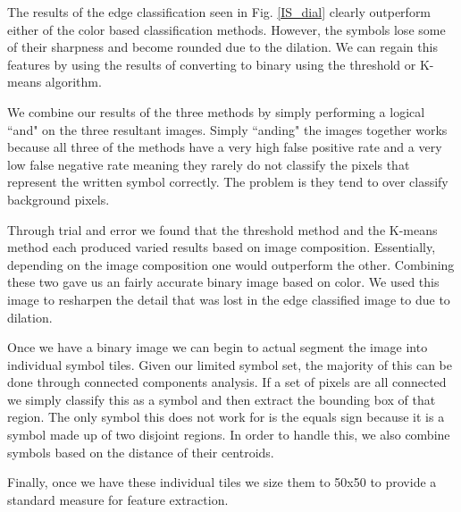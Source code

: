 
The results of the edge classification seen in Fig. \ref{IS_dial} clearly outperform either of the color based classification methods. However, the symbols lose some of their sharpness and become rounded due to the dilation. We can regain this features by using the results of converting to binary using the threshold or K-means algorithm.

We combine our results of the three methods by simply performing a logical ``and" on the three resultant images. Simply ``anding" the images together works because all three of the methods have a very high false positive rate and a very low false negative rate meaning they rarely do not classify the pixels that represent the written symbol correctly. The problem is they tend to over classify background pixels.


Through trial and error we found that the threshold method and the K-means method each produced varied results based on image composition. Essentially, depending on the image composition one would outperform the other. Combining these two gave us an fairly accurate binary image based on color. We used this image to resharpen the detail that was lost in the edge classified image to due to dilation.

Once we have a binary image we can begin to actual segment the image into individual symbol tiles. Given our limited symbol set, the majority of this can be done through connected components analysis. If a set of pixels are all connected we simply classify this as a symbol and then extract the bounding box of that region. The only symbol this does not work for is the equals sign because it is a symbol made up of two disjoint regions. In order to handle this, we also combine symbols based on the distance of their centroids.

Finally, once we have these individual tiles we size them to 50x50 to provide a standard measure for feature extraction.  

